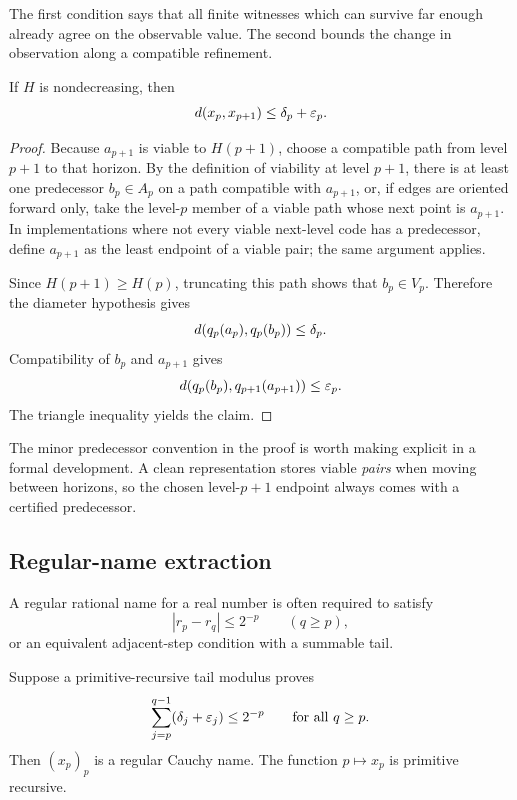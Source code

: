 The first condition says that all finite witnesses which can survive far enough already agree on the observable value.  The second bounds the change in observation along a compatible refinement.

\begin{theorem}
\label{thm:adjacent-coherence}
If \(H\) is nondecreasing, then
\[
 d(x_p,x_{p+1})\le \delta_p+\varepsilon_p.
\]
\end{theorem}

\begin{proof}
Because \(a_{p+1}\) is viable to \(H(p+1)\), choose a compatible path from level \(p+1\) to that horizon.  By the definition of viability at level \(p+1\), there is at least one predecessor \(b_p\in A_p\) on a path compatible with \(a_{p+1}\), or, if edges are oriented forward only, take the level-\(p\) member of a viable path whose next point is \(a_{p+1}\).  In implementations where not every viable next-level code has a predecessor, define \(a_{p+1}\) as the least endpoint of a viable pair; the same argument applies.

Since \(H(p+1)\ge H(p)\), truncating this path shows that \(b_p\in V_p\).  Therefore the diameter hypothesis gives
\[
 d(q_p(a_p),q_p(b_p))\le\delta_p.
\]
Compatibility of \(b_p\) and \(a_{p+1}\) gives
\[
 d(q_p(b_p),q_{p+1}(a_{p+1}))\le\varepsilon_p.
\]
The triangle inequality yields the claim.
\end{proof}

The minor predecessor convention in the proof is worth making explicit in a formal development.  A clean representation stores viable \emph{pairs} when moving between horizons, so the chosen level-\(p+1\) endpoint always comes with a certified predecessor.

\subsection{Regular-name extraction}

A regular rational name for a real number is often required to satisfy
\[
 |r_p-r_q|\le 2^{-p}\qquad(q\ge p),
\]
or an equivalent adjacent-step condition with a summable tail.

\begin{theorem}
\label{thm:regular-name}
Suppose a primitive-recursive tail modulus proves
\[
  \sum_{j=p}^{q-1}(\delta_j+\varepsilon_j)\le 2^{-p}
  \qquad\text{for all }q\ge p.
\]
Then \((x_p)_p\) is a regular Cauchy name.  The function \(p\mapsto x_p\) is primitive recursive.
\end{theorem}

